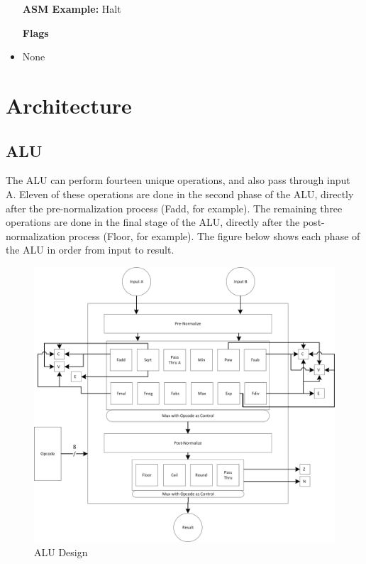 \documentclass[letter,14pt]{article}
\begin{document}
\begin{itemize}
    \setlength{\parskip}{0pt}
    \setlength{\itemsep}{0pt plus 1pt}
    \setlength{\itemindent}{-4mm}
    \item[] \textbf{ASM Example:} Halt
\end{itemize}
\begin{itemize}
    \setlength{\parskip}{0pt}
    \setlength{\itemsep}{0pt plus 1pt}
    \setlength{\itemindent}{7mm}
    \item [\textbf{Flags}]
    \item None
\end{itemize}



\newpage
\section{Architecture}

\subsection{ALU}
	
The ALU can perform fourteen unique operations, and also pass through input A. Eleven of these operations are done in the second phase of the ALU, directly after the pre-normalization process (Fadd, for example). The remaining three operations are done in the final stage of the ALU, directly after the post-normalization process (Floor, for example). The figure below shows each phase of the ALU in order from input to result.
	
	\begin{figure}[H]
	\begin{center}
	\includegraphics[width=1\linewidth]{ALU.png}
	\caption{ALU Design}
	\end{center}
	\end{figure}
	
\end{document}
